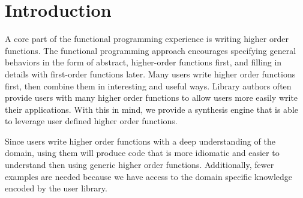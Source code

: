\section{Introduction} 
\label{intro}

A core part of the functional programming experience is writing higher order functions. The functional programming approach encourages specifying general behaviors in the form of abstract, higher-order functions first, and filling in details with first-order functions later. Many users write higher order functions first, then combine them in interesting and useful ways. Library authors often provide users with many higher order functions to allow users more easily write their applications. With this in mind, we provide a synthesis engine that is able to leverage user defined higher order functions.

Since users write higher order functions with a deep understanding of the domain, using them will produce code that is more idiomatic and easier to understand then using generic higher order functions. Additionally, fewer examples are needed because we have access to the domain specific knowledge encoded by the user library.
